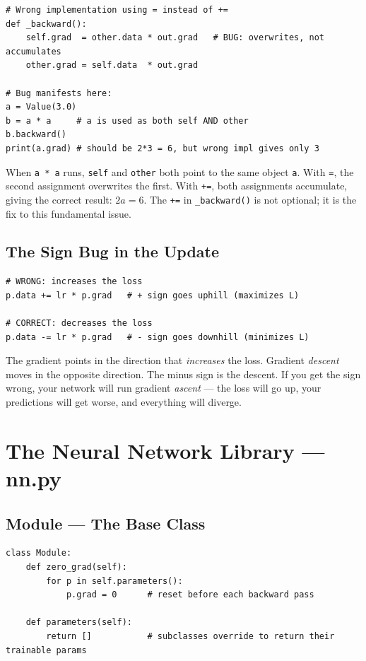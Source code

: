 \documentclass[12pt,a4paper]{article}
\newcommand{\code}[1]{\texttt{\small\color{deepblue}#1}}
\begin{document}
\begin{lstlisting}
# Wrong implementation using = instead of +=
def _backward():
    self.grad  = other.data * out.grad   # BUG: overwrites, not accumulates
    other.grad = self.data  * out.grad

# Bug manifests here:
a = Value(3.0)
b = a * a     # a is used as both self AND other
b.backward()
print(a.grad) # should be 2*3 = 6, but wrong impl gives only 3
\end{lstlisting}

When \code{a * a} runs, \code{self} and \code{other} both point to the same object \code{a}. With \code{=}, the second assignment overwrites the first. With \code{+=}, both assignments accumulate, giving the correct result: $2a = 6$. The \code{+=} in \code{\_backward()} is not optional; it is the fix to this fundamental issue.

\subsection{The Sign Bug in the Update}

\begin{lstlisting}
# WRONG: increases the loss
p.data += lr * p.grad   # + sign goes uphill (maximizes L)

# CORRECT: decreases the loss
p.data -= lr * p.grad   # - sign goes downhill (minimizes L)
\end{lstlisting}

The gradient points in the direction that \emph{increases} the loss. Gradient \emph{descent} moves in the opposite direction. The minus sign is the descent. If you get the sign wrong, your network will run gradient \emph{ascent} — the loss will go up, your predictions will get worse, and everything will diverge.

\section{The Neural Network Library — nn.py}

\subsection{Module — The Base Class}

\begin{lstlisting}
class Module:
    def zero_grad(self):
        for p in self.parameters():
            p.grad = 0      # reset before each backward pass

    def parameters(self):
        return []           # subclasses override to return their trainable params
\end{lstlisting}
\end{document}

